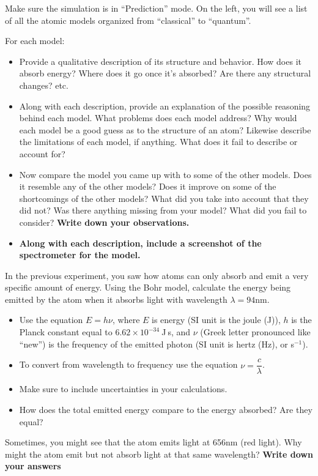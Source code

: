 \begin{steps}
	\item Make sure the simulation is in ``Prediction'' mode. On the left, you will see a list of all the atomic models organized from ``classical'' to ``quantum''.
	
	\item For each model:
	\begin{itemize}
		\item Provide a qualitative description of its structure and behavior. How does it absorb energy? Where does it go once it's absorbed? Are there any structural changes? etc. 
	
		\item Along with each description, provide an explanation of the possible reasoning behind each model. What problems does each model address? Why would each model be a good guess as to the structure of an atom? Likewise describe the limitations of each model, if anything. What does it fail to describe or account for?
	
		\item Now compare the model you came up with to some of the other models. Does it resemble any of the other models? Does it improve on some of the shortcomings of the other models? What did you take into account that they did not? Was there anything missing from your model? What did you fail to consider? \textbf{Write down your observations.}
	
		\item \textbf{Along with each description, include a screenshot of the spectrometer for the model.} 
	\end{itemize}
	
	\item In the previous experiment, you saw how atoms can only absorb and emit a very specific amount of energy. Using the Bohr model, calculate the energy being emitted by the atom when it absorbs light with wavelength $\lambda = 94$nm. 
	\begin{itemize}
		\item Use the equation $\mathit{E} = \mathit{h}\nu$, where $\mathit{E}$ is energy (SI unit is the joule (J)), $\mathit{h}$ is the Planck constant equal to $6.62 \times 10^{-34}\:$J$\:$s, and $\nu$ (Greek letter pronounced like ``new'') is the frequency of the emitted photon (SI unit is hertz (Hz), or s$^{-1}$).
		
		\item To convert from wavelength to frequency use the equation $\nu = \dfrac{c}{\lambda}$. 
		
		\item Make sure to include uncertainties in your calculations.
		
		\item How does the total emitted energy compare to the energy absorbed? Are they equal?
	\end{itemize}
	
	\item Sometimes, you might see that the atom emits light at 656nm (red light). Why might the atom emit but not absorb light at that same wavelength? \textbf{Write down your answers}
\end{steps}

